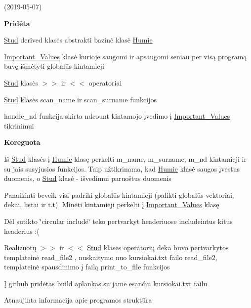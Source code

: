 (2019-\/05-\/07)

 {\bfseries{Pridėta}}
\begin{DoxyItemize}
\item {\ttfamily \mbox{\hyperlink{class_stud}{Stud}}} derived klasės abstrakti bazinė klasė {\ttfamily \mbox{\hyperlink{class_humie}{Humie}}}
\item {\ttfamily \mbox{\hyperlink{class_important___values}{Important\+\_\+\+Values}}} klasė kurioje saugomi ir apsaugomi seniau per visą programą buvę išmėtyti globalūs kintamieji
\item {\ttfamily \mbox{\hyperlink{class_stud}{Stud}}} klasės $>$$>$ ir $<$$<$ operatoriai
\item {\ttfamily \mbox{\hyperlink{class_stud}{Stud}}} klasės {\ttfamily scan\+\_\+name} ir {\ttfamily scan\+\_\+surname} funkcijos
\item {\ttfamily handle\+\_\+nd} funkcija skirta {\ttfamily ndcount} kintamojo įvedimo į {\ttfamily \mbox{\hyperlink{class_important___values}{Important\+\_\+\+Values}}} tikrinimui
\end{DoxyItemize}

{\bfseries{Koreguota}}
\begin{DoxyItemize}
\item Iš {\ttfamily \mbox{\hyperlink{class_stud}{Stud}}} klasės į {\ttfamily \mbox{\hyperlink{class_humie}{Humie}}} klasę perkelti {\ttfamily m\+\_\+name, m\+\_\+surname, m\+\_\+nd} kintamieji ir su jais susyjusios funkcijos. Taip užtikrinama, kad {\ttfamily \mbox{\hyperlink{class_humie}{Humie}}} klasė saugos įvestus duomenis, o {\ttfamily \mbox{\hyperlink{class_stud}{Stud}}} klasė -\/ išvedimui paruoštus duomenis
\item Panaikinti beveik visi padriki globalūs kintamieji (palikti globalūs vektoriai, dekai, listai ir t.\+t). Minėti kintamieji perkelti į {\ttfamily \mbox{\hyperlink{class_important___values}{Important\+\_\+\+Values}}} klasę
\item Dėl sutikto \char`\"{}circular include\char`\"{} teko pertvarkyt headeriuose include\textquotesingle{}intus kitus headerius \+:(
\item Realizuotų $>$$>$ ir $<$$<$ {\ttfamily \mbox{\hyperlink{class_stud}{Stud}}} klasės operatorių deka buvo pertvarkytos template\textquotesingle{}inė {\ttfamily read\+\_\+file2} , nuskaitymo nuo {\ttfamily kursiokai.\+txt} failo {\ttfamily read\+\_\+file2}, template\textquotesingle{}inė spausdinimo į failą {\ttfamily print\+\_\+to\+\_\+file} funkcijos
\item Į github pridėtas {\ttfamily build} aplankas su jame esančiu kursiokai.\+txt failu
\item Atnaujinta informacija apie programos struktūra
\end{DoxyItemize}

